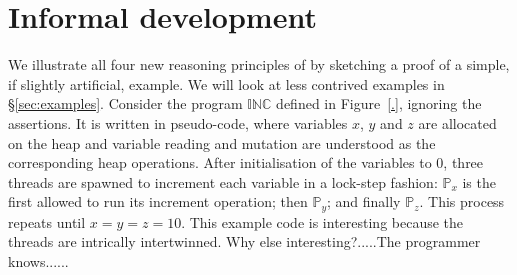 \section{Informal development}
\label{sec:intuition}

We illustrate  all four new reasoning principles of \colosl by
sketching a proof of a simple, if slightly artificial,  example. 
We will look at less contrived examples in
\S\ref{sec:examples}. Consider the program $\mathbb{INC}$ defined
in Figure~\ref{.}, ignoring the assertions. It is written in pseudo-code, where variables $x$, $y$ and $z$ are allocated
on the heap and variable reading and mutation are understood as the
corresponding heap operations. After initialisation of the variables
to $0$, three threads are spawned to increment each variable in a
lock-step fashion: $\mathbb{P}_x$ is the first allowed to run its
increment operation; then $\mathbb{P}_y$;  and finally
$\mathbb{P}_z$. This process repeats until $x = y = z = 10$.
This example code is interesting because the threads are intrically
intertwinned. Why else interesting?.....The programmer knows......

